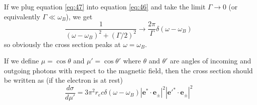 \documentclass[letterpaper, 11pt]{article}
\numberwithin{equation}{section}
\numberwithin{figure}{section}
\begin{document}
If we plug equation \eqref{eq:47} into equation \eqref{eq:46} and take the limit $\Gamma \to 0$ (or equivalently $\Gamma\ll \omega_B$), we get
\begin{equation}
    \label{eq:48}
    \frac{1}{(\omega - \omega_B)^2 + (\Gamma/2)^2}\longrightarrow\frac{2\pi}{\Gamma}\delta(\omega - \omega_B)
\end{equation}
so obviously the cross section peaks at $\omega = \omega_B$.

If we define $\mu = \cos\theta$ and $\mu' = \cos\theta'$ where $\theta$ and $\theta'$ are angles of incoming and outgoing photons with respect to the magnetic field, then the cross section should be written as (if the electron is at rest)
\begin{equation}
    \label{eq:49}
    \frac{d\sigma}{d\mu'} = 3\pi^2r_ec\delta(\omega - \omega_B)\left| \boldsymbol{e}^{*}\cdot \boldsymbol{e}_\pm \right|^2 \left| \boldsymbol{e}'^{*}\cdot \boldsymbol{e}_\pm \right|^2
\end{equation}
\end{document}
